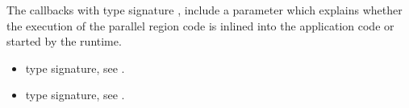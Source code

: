 \descr
The callbacks with type signature , 
include a parameter  which explains whether the execution of the parallel
region code is inlined into the application code or started by the runtime.


\crossreferences
\begin{itemize}
\item {} type signature, see 
.
\item {} type signature, see 
.
\end{itemize}

